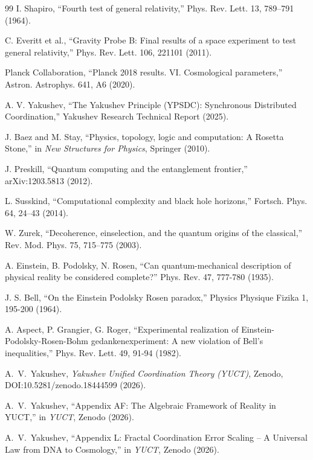 \documentclass[11pt,a4paper]{article}
\begin{document}
\begin{thebibliography}{99}
		 I. Shapiro, ``Fourth test of general relativity,'' Phys. Rev. Lett. 13, 789–791 (1964).
		
		 C. Everitt et al., ``Gravity Probe B: Final results of a space experiment to test general relativity,'' Phys. Rev. Lett. 106, 221101 (2011).
		
		 Planck Collaboration, ``Planck 2018 results. VI. Cosmological parameters,'' Astron. Astrophys. 641, A6 (2020).
		
		 A. V. Yakushev, ``The Yakushev Principle (YPSDC): Synchronous Distributed Coordination,'' Yakushev Research Technical Report (2025).
		
		 J. Baez and M. Stay, ``Physics, topology, logic and computation: A Rosetta Stone,'' in \emph{New Structures for Physics}, Springer (2010).
		
		 J. Preskill, ``Quantum computing and the entanglement frontier,'' arXiv:1203.5813 (2012).
		
		 L. Susskind, ``Computational complexity and black hole horizons,'' Fortsch. Phys. 64, 24–43 (2014).
		
		 W. Zurek, ``Decoherence, einselection, and the quantum origins of the classical,'' Rev. Mod. Phys. 75, 715–775 (2003).
		
		 A. Einstein, B. Podolsky, N. Rosen, ``Can quantum-mechanical description of physical reality be considered complete?'' Phys. Rev. 47, 777-780 (1935).
		
		 J. S. Bell, ``On the Einstein Podolsky Rosen paradox,'' Physics Physique Fizika 1, 195-200 (1964).
		
		 A. Aspect, P. Grangier, G. Roger, ``Experimental realization of Einstein-Podolsky-Rosen-Bohm gedankenexperiment: A new violation of Bell's inequalities,'' Phys. Rev. Lett. 49, 91-94 (1982).
		
		A.~V.~Yakushev, \emph{Yakushev Unified Coordination Theory (YUCT)}, Zenodo, DOI:10.5281/zenodo.18444599 (2026).
		
		A.~V.~Yakushev, ``Appendix AF: The Algebraic Framework of Reality in YUCT,'' in \emph{YUCT}, Zenodo (2026).
		
		A.~V.~Yakushev, ``Appendix L: Fractal Coordination Error Scaling – A Universal Law from DNA to Cosmology,'' in \emph{YUCT}, Zenodo (2026).
		

\end{thebibliography}
\end{document}
